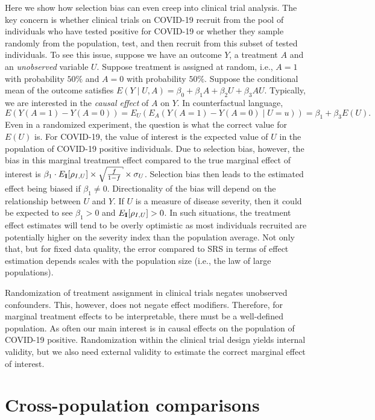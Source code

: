 \documentclass[aoas]{amsart}
\def\I{\bf I}
\begin{document}
Here we show how selection bias can even creep into clinical trial analysis. The key concern is whether clinical trials on COVID-19 recruit from the pool of individuals who have tested positive for COVID-19 or whether they sample randomly from the population, test, and then recruit from this subset of tested individuals.  To see this issue, suppose we have an outcome $Y$, a treatment $A$ and an \emph{unobserved} variable $U$.  Suppose treatment is assigned at random, i.e., $A =1$ with probability $50\%$ and $A=0$ with probability $50\%$.  Suppose the conditional mean of the outcome satisfies  $E(Y \mid U, A ) = \beta_0 + \beta_1 A + \beta_2 U + \beta_3 A U$.  Typically, we are interested in the \emph{causal effect} of $A$ on $Y$.  In counterfactual language,
$$
E( Y(A=1) - Y(A=0) ) = E_U ( E_A ( Y(A=1) - Y(A=0) \mid U=u ))
= \beta_1 + \beta_3 E(U).
$$
Even in a randomized experiment, the question is what the correct value for $E(U)$ is. For COVID-19, the value of interest is the expected value of $U$ in the population of COVID-19 positive individuals.  Due to selection bias, however, the bias in this marginal treatment effect compared to the true marginal effect of interest is $\beta_1 \cdot E_{\I} [ \rho_{I,U} ] \times \sqrt{ \frac{f}{1-f} } \times \sigma_U$.  Selection bias then leads to the estimated effect being biased if $\beta_1 \neq 0$.  Directionality of the bias will depend on the relationship between $U$ and $Y$.  If $U$ is a measure of disease severity, then it could be expected to see $\beta_1 > 0$ and $E_{\I} [ \rho_{I, U} ] >0$.  In such situations, the treatment effect estimates will tend to be overly optimistic as most individuals recruited are potentially higher on the severity index than the population average.  Not only that, but for fixed data quality, the error compared to SRS in terms of effect estimation depends scales with the population size (i.e., the law of large populations).

Randomization of treatment assignment in clinical trials negates unobserved confounders.  This, however, does not negate effect modifiers.  Therefore, for marginal treatment effects to be interpretable, there must be a well-defined population.  As often our main interest is in causal effects on the population of COVID-19 positive.  Randomization within the clinical trial design yields internal validity, but we also need external validity to estimate the correct marginal effect of interest.

\section{Cross-population comparisons}
\end{document}
